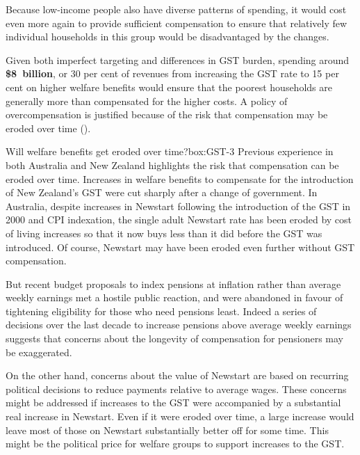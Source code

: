 \documentclass{grattanAlpha}
\begin{document}
Because low-income people also have diverse patterns of spending, it would cost even more again to provide sufficient compensation to ensure that relatively few individual households in this group would be disadvantaged by the changes. 

Given both imperfect targeting and differences in GST burden, spending around \textbf{\$8~billion}, or 30 per cent of revenues from increasing the GST rate to 15 per cent  on higher welfare benefits would ensure that the poorest households are generally more than compensated for the higher costs. A policy of overcompensation is justified because of the risk that compensation may be eroded over time ().

\begin{smallbox}{Will welfare benefits get eroded over time?}{box:GST-3}
Previous experience in both Australia and New Zealand highlights the risk that compensation can be eroded over time. Increases in welfare benefits to compensate for the introduction of New Zealand’s GST were cut sharply after a change of government. In Australia, despite increases in Newstart following the introduction of the GST in 2000 and CPI indexation, the single adult Newstart rate has been eroded by cost of living increases so that it now buys less than it did before the GST was introduced.  Of course, Newstart may have been eroded even further without GST compensation.

But recent budget proposals to index pensions at inflation rather than average weekly earnings met a hostile public reaction, and were abandoned in favour of tightening eligibility for those who need pensions least.  Indeed a series of decisions over the last decade to increase pensions above average weekly earnings  suggests that concerns about the longevity of compensation for pensioners may be exaggerated.

On the other hand, concerns about the value of Newstart are based on recurring political decisions to reduce payments relative to average wages. These concerns might be addressed if increases to the GST were accompanied by a substantial real increase in Newstart. Even if it were eroded over time, a large increase would leave most of those on Newstart substantially better off for some time. This might be the political price for welfare groups to support increases to the GST. 

\end{smallbox}
\end{document}
